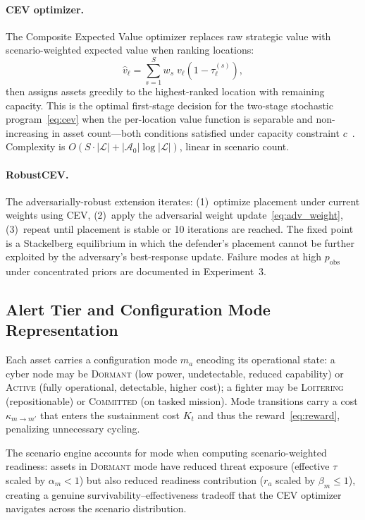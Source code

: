 \documentclass[11pt]{article}
\begin{document}
\paragraph{CEV optimizer.}
The Composite Expected Value optimizer replaces raw strategic value
with scenario-weighted expected value when ranking locations:
\begin{equation}
    \hat{v}_\ell = \sum_{s=1}^{S} w_s\; v_\ell
    \left(1 - \tau_\ell^{(s)}\right),
\end{equation}
then assigns assets greedily to the highest-ranked location with
remaining capacity. This is the optimal first-stage decision for the
two-stage stochastic program~\eqref{eq:cev} when the per-location value
function is separable and non-increasing in asset count---both conditions
satisfied under capacity constraint $c$~\cite{salmeron2010,nelson2025}.
Complexity is $O(S \cdot |\mathcal{L}| + |\mathcal{A}_0| \log
|\mathcal{L}|)$, linear in scenario count.

\paragraph{RobustCEV.}
The adversarially-robust extension iterates:
(1)~optimize placement under current weights using CEV,
(2)~apply the adversarial weight update~\eqref{eq:adv_weight},
(3)~repeat until placement is stable or 10 iterations are reached.
The fixed point is a Stackelberg equilibrium in which the defender's
placement cannot be further exploited by the adversary's best-response
update. Failure modes at high $p_{\mathrm{obs}}$
under concentrated priors are documented in Experiment~3.

\subsection{Alert Tier and Configuration Mode Representation}
\label{sec:approach:modes}

Each asset carries a configuration mode $m_a$ encoding its operational
state: a cyber node may be \textsc{Dormant} (low power, undetectable,
reduced capability) or \textsc{Active} (fully operational, detectable,
higher cost); a fighter may be \textsc{Loitering} (repositionable) or
\textsc{Committed} (on tasked mission). Mode transitions carry a cost
$\kappa_{m \to m'}$ that enters the sustainment cost $K_t$ and thus the
reward~\eqref{eq:reward}, penalizing unnecessary cycling.

The scenario engine accounts for mode when computing scenario-weighted
readiness: assets in \textsc{Dormant} mode have reduced threat exposure
(effective $\tau$ scaled by $\alpha_m < 1$) but also reduced readiness
contribution ($r_a$ scaled by $\beta_m \leq 1$), creating a genuine
survivability--effectiveness tradeoff that the CEV optimizer navigates
across the scenario distribution.
\end{document}
